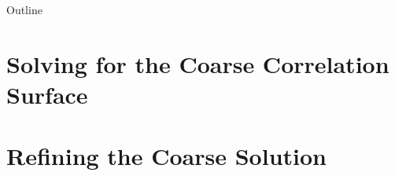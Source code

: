 \documentclass[11pt]{beamer}
\begin{document}
	
	\begin{frame}
		\titlepage
	\end{frame}
	
	\begin{frame}{Outline}
		\tableofcontents
	\end{frame}
	
	
	
	
	
	
	
	
	
	
	\renewcommand{\sectionsubtitle}{AKA: "How to convert between the time and frequency domains as fast as possible"}
	\section{Solving for the Coarse Correlation Surface}
	
	\renewcommand{\sectionsubtitle}{}
	
	
	
	\section{Refining the Coarse Solution}
	
	
\end{document}
